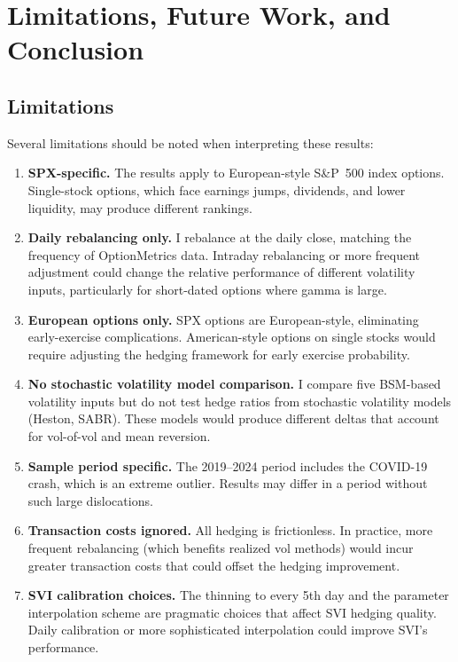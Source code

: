 \documentclass[12pt, letterpaper]{article}
\begin{document}
\section{Limitations, Future Work, and Conclusion}
\label{sec:conclusion}

\subsection{Limitations}

Several limitations should be noted when interpreting these results:

\begin{enumerate}
    \item \textbf{SPX-specific.} The results apply to European-style S\&P~500 index options. Single-stock options, which face earnings jumps, dividends, and lower liquidity, may produce different rankings.

    \item \textbf{Daily rebalancing only.} I rebalance at the daily close, matching the frequency of OptionMetrics data. Intraday rebalancing or more frequent adjustment could change the relative performance of different volatility inputs, particularly for short-dated options where gamma is large.

    \item \textbf{European options only.} SPX options are European-style, eliminating early-exercise complications. American-style options on single stocks would require adjusting the hedging framework for early exercise probability.

    \item \textbf{No stochastic volatility model comparison.} I compare five BSM-based volatility inputs but do not test hedge ratios from stochastic volatility models (Heston, SABR). These models would produce different deltas that account for vol-of-vol and mean reversion.

    \item \textbf{Sample period specific.} The 2019--2024 period includes the COVID-19 crash, which is an extreme outlier. Results may differ in a period without such large dislocations.

    \item \textbf{Transaction costs ignored.} All hedging is frictionless. In practice, more frequent rebalancing (which benefits realized vol methods) would incur greater transaction costs that could offset the hedging improvement.

    \item \textbf{SVI calibration choices.} The thinning to every 5th day and the parameter interpolation scheme are pragmatic choices that affect SVI hedging quality. Daily calibration or more sophisticated interpolation could improve SVI's performance.
\end{enumerate}
\end{document}
